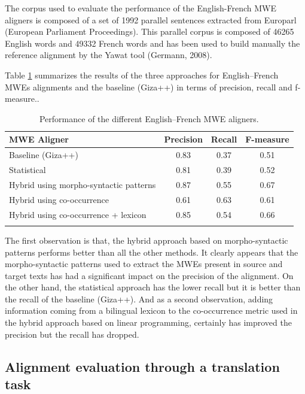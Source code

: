 \documentclass[output=paper,modfonts,nonflat]{langsci/langscibook}
\begin{document}
The corpus used to evaluate the performance of the English-French MWE aligners is composed of a set of 1992 parallel sentences extracted from Europarl (European Parliament Proceedings). This parallel corpus is composed of 46265 English words and 49332 French words and has been used to build manually the reference alignment by the Yawat tool (Germann, 2008).

Table \ref{tab:resultsPRF_en-fr} summarizes the results of the three approaches for English--French MWEs alignments and the baseline (Giza++) in terms of precision, recall and f-measure..

\begin{table}
\caption{Performance of the different English--French MWE aligners.}
\label{tab:resultsPRF_en-fr}
 \begin{tabular}{p{6.5cm}ccc}
  \lsptoprule
            \textbf{MWE Aligner} & \textbf{Precision} & \textbf{Recall} & \textbf{F-measure} \\
  \midrule
Baseline (Giza++) & 0.83 & 0.37 & 0.51 \\
Statistical & 0.81 & 0.39 & 0.52 \\
Hybrid using morpho-syntactic patterns & 0.87 & 0.55 & 0.67 \\
Hybrid using co-occurrence & 0.61 & 0.63 & 0.61 \\
Hybrid using co-occurrence + lexicon & 0.85 & 0.54 & 0.66 \\
  \lspbottomrule
 \end{tabular}
\end{table}



The first observation is that, the hybrid approach based on morpho-syntactic patterns performs better than all the other methods. It clearly appears that the morpho-syntactic patterns used to extract the MWEs present in source and target texts has had a significant impact on the precision of the alignment. On the other hand, the statistical approach has the lower recall but it is better than the recall of the baseline (Giza++). And as a second observation, adding information coming from a bilingual lexicon to the co-occurrence metric used in the hybrid approach based on linear programming, certainly has improved the precision but the recall has dropped.

\subsection{Alignment evaluation through a translation task}
\end{document}
